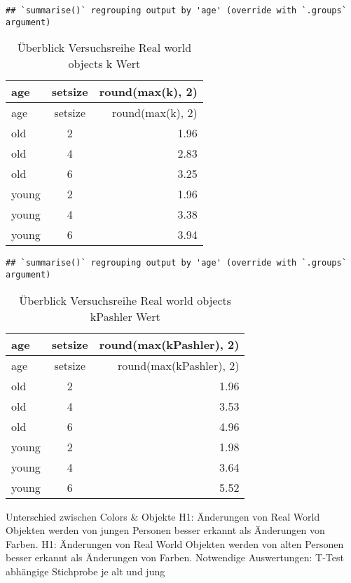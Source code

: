 \documentclass[
]{article}
\newenvironment{Shaded}{\begin{snugshade}}{\end{snugshade}}
\newcommand{\DataTypeTok}[1]{\textcolor[rgb]{0.13,0.29,0.53}{#1}}
\newcommand{\DecValTok}[1]{\textcolor[rgb]{0.00,0.00,0.81}{#1}}
\newcommand{\KeywordTok}[1]{\textcolor[rgb]{0.13,0.29,0.53}{\textbf{#1}}}
\newcommand{\NormalTok}[1]{#1}
\newcommand{\OperatorTok}[1]{\textcolor[rgb]{0.81,0.36,0.00}{\textbf{#1}}}
\newcommand{\StringTok}[1]{\textcolor[rgb]{0.31,0.60,0.02}{#1}}
\begin{document}
\begin{verbatim}
## `summarise()` regrouping output by 'age' (override with `.groups` argument)
\end{verbatim}

\begin{longtable}[]{@{}lcr@{}}
\caption{Überblick Versuchsreihe Real world objects k
Wert}\tabularnewline
\toprule
age & setsize & round(max(k), 2)\tabularnewline
\midrule
\endfirsthead
\toprule
age & setsize & round(max(k), 2)\tabularnewline
\midrule
\endhead
old & 2 & 1.96\tabularnewline
old & 4 & 2.83\tabularnewline
old & 6 & 3.25\tabularnewline
young & 2 & 1.96\tabularnewline
young & 4 & 3.38\tabularnewline
young & 6 & 3.94\tabularnewline
\bottomrule
\end{longtable}

\begin{Shaded}
\end{Shaded}

\begin{verbatim}
## `summarise()` regrouping output by 'age' (override with `.groups` argument)
\end{verbatim}

\begin{longtable}[]{@{}lcr@{}}
\caption{Überblick Versuchsreihe Real world objects kPashler
Wert}\tabularnewline
\toprule
age & setsize & round(max(kPashler), 2)\tabularnewline
\midrule
\endfirsthead
\toprule
age & setsize & round(max(kPashler), 2)\tabularnewline
\midrule
\endhead
old & 2 & 1.96\tabularnewline
old & 4 & 3.53\tabularnewline
old & 6 & 4.96\tabularnewline
young & 2 & 1.98\tabularnewline
young & 4 & 3.64\tabularnewline
young & 6 & 5.52\tabularnewline
\bottomrule
\end{longtable}

Unterschied zwischen Colors \& Objekte H1: Änderungen von Real World
Objekten werden von jungen Personen besser erkannt als Änderungen von
Farben. H1: Änderungen von Real World Objekten werden von alten Personen
besser erkannt als Änderungen von Farben. Notwendige Auswertungen:
T-Test abhängige Stichprobe je alt und jung
\end{document}
